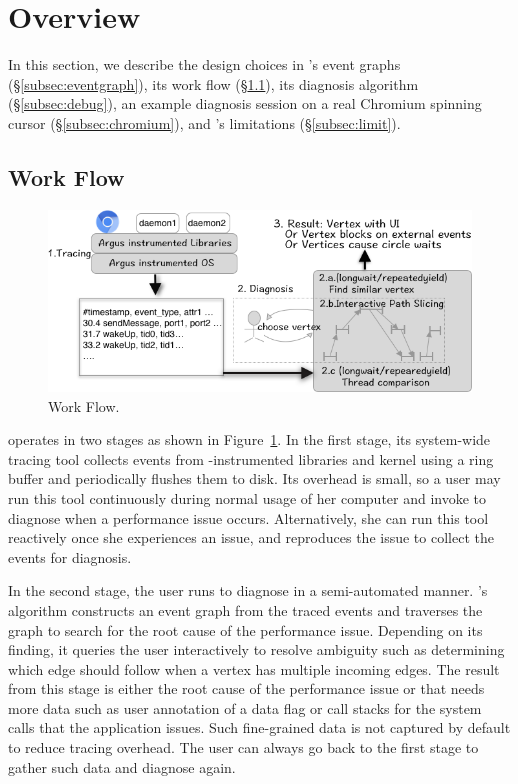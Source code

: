 \section{Overview}\label{sec:overview}

In this section, we describe the design choices in \xxx's event graphs
(\S\ref{subsec:eventgraph}), its work flow (\S\ref{subsec:overflow}), its
diagnosis algorithm (\S\ref{subsec:debug}), an example diagnosis session
on a real Chromium spinning cursor (\S\ref{subsec:chromium}), and
\xxx's limitations (\S\ref{subsec:limit}).



\subsection{\xxx Work Flow} \label{subsec:overflow}

\begin{figure}[tb]
    \centering
	\includegraphics[width=\columnwidth]{./figures/Argus_overview.png}
    \caption{\xxx Work Flow.}
    \label{fig:argus-overview}
\end{figure}

\xxx operates in two stages as shown in
Figure~\ref{fig:argus-overview}. In the first stage, its system-wide
tracing tool collects events from \xxx-instrumented libraries and kernel
using a ring buffer and periodically flushes them to disk.  Its overhead
is small, so a user may run this tool continuously during normal usage of
her computer and invoke \xxx to diagnose when a performance issue occurs.
Alternatively, she can run this tool reactively once she experiences an
issue, and reproduces the issue to collect the events for diagnosis.

In the second stage, the user runs \xxx to diagnose in a semi-automated
manner.  \xxx's algorithm constructs an event graph from the traced events
and traverses the graph to search for the root cause of the performance
issue.  Depending on its finding, it queries the user interactively to
resolve ambiguity such as determining which edge \xxx should follow when a
vertex has multiple incoming edges.  The result from this stage is either
the root cause of the performance issue or that \xxx needs more data such
as user annotation of a data flag or call stacks for the system calls that
the application issues.  Such fine-grained data is not captured by default
to reduce tracing overhead.  The user can always go back to the first
stage to gather such data and diagnose again.

